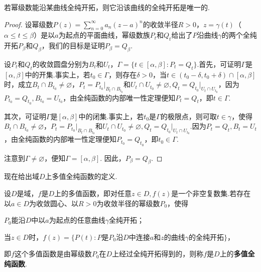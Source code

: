 \begin{prop}\label{prop6.3.4}
  若幂级数能沿某曲线全纯开拓，则它沿该曲线的全纯开拓是唯一的.
\end{prop}
\begin{proof}
  设幂级数$P(z)=\sum_{n=0}^\infty a_n(z-a)^n$的收敛半径$R>0$，$z=\gamma(t)$（$\alpha\le t\le\beta$）是以$a$为起点的平面曲线，幂级数族$P_t$和$Q_t$给出了$P$沿曲线$\gamma$的两个全纯开拓$P_\beta$和$Q_\beta$，我们的目标是证明$P_\beta=Q_\beta$.

  设$P_t$和$Q_t$的收敛圆盘分别为$B_t$和$U_t$，$\Gamma=\{t\in[\alpha,\beta]:P_t=Q_t\}$.首先，可证明$\Gamma$是$[\alpha,\beta]$中的开集.事实上，若$t_0\in\Gamma$，则存在$\delta>0$，当$t\in(t_0-\delta,t_0+\delta)\cap[\alpha,\beta]$时，成立$B_t\cap B_{t_0}\ne\varnothing$，$P_t=P_{t_0}\big|_{B_t\cap B_{t_0}}$和$U_t\cap U_{t_0}\ne\varnothing,Q_t=Q_{t_0}\big|_{U_t\cap U_{t_0}}$，因为$P_{t_0}=Q_{t_0},B_{t_0}=U_{t_0}$，由全纯函数的内部唯一性定理便知$P_t=Q_t$，即$t\in\Gamma$.

  其次，可证明$\Gamma$是$[\alpha,\beta]$中的闭集.事实上，若$t_0$是$\Gamma$的极限点，则可取$t\in\gamma$，使得$B_t\cap B_{t_0}\ne\varnothing$，$P_t=P_{t_0}\big|_{B_t\cap B_{t_0}}$和$U_t\cap U_{t_0}\ne\varnothing,Q_t=Q_{t_0}\big|_{U_t\cap U_{t_0}}$.因为$P_t=Q_t,B_t=U_t$，由全纯函数的内部唯一性定理便知$P_{t_0}=Q_{t_0}$，即$t_0\in\Gamma$.

  注意到$\Gamma\ne\varnothing$，便知$\Gamma=[\alpha,\beta]$. 因此，$P_\beta=Q_\beta$.
\end{proof}

现在给出域$D$上多值全纯函数的定义.
\begin{definition}\label{def6.3.5}
  设$D$是域，$f$是$D$上的多值函数，即对任意$z\in D,f(z)$是一个非空复数集.若存在以$a\in D$为收敛圆心、以$R>0$为收敛半径的幂级数$P_0$，使得
  \begin{eenum}
    \item $P_0$能沿$D$中以$a$为起点的任意曲线$\gamma$全纯开拓；
    \item 当$z\in D$时，$f(z)=\{P(t):\mbox{$P$是$P_0$沿$D$中连接$a$和$z$的曲线$\gamma$的全纯开拓}\}$，
  \end{eenum}
  即$f$这个多值函数是由幂级数$P_0$在$D$上经过全纯开拓得到的，则称$f$是$D$上的\textbf{多值全纯函数}.
\end{definition}

